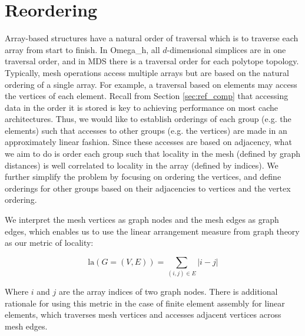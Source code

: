 \section{Reordering}
\label{sec:reorder}

Array-based structures have a natural order of traversal which is to
traverse each array from start to finish.
In Omega\_h, all $d$-dimensional simplices are in one traversal order,
and in MDS there is a traversal order for each polytope topology.
Typically, mesh operations access multiple arrays but are based on
the natural ordering of a single array.
For example, a traversal based on elements may access the vertices
of each element.
Recall from Section \ref{sec:ref_comp} that accessing data in the order
it is stored is key to achieving
performance on most cache architectures.
Thus, we would like to establish orderings of each group (e.g. the elements)
such that accesses to other groups (e.g. the vertices) are made
in an approximately linear fashion.
Since these accesses are based on adjacency, what we aim to do
is order each group such that locality in the mesh (defined by graph distances)
is well correlated to locality in the array (defined by indices).
We further simplify the problem by focusing on ordering the vertices,
and define orderings for other groups based on their adjacencies to
vertices and the vertex ordering.

We interpret the mesh vertices as graph nodes and the mesh edges
as graph edges, which enables us to use the linear arrangement
measure from graph theory \cite{garey1976some} as our metric of locality:

\begin{equation}\label{eq:la}
\text{la}(G=(V,E)) = \sum_{(i,j)\in E} |i-j|
\end{equation}

Where $i$ and $j$ are the array indices of two graph nodes.
There is additional rationale for using this metric in the case
of finite element assembly for linear elements, which traverses
mesh vertices and accesses adjacent vertices across mesh edges.

